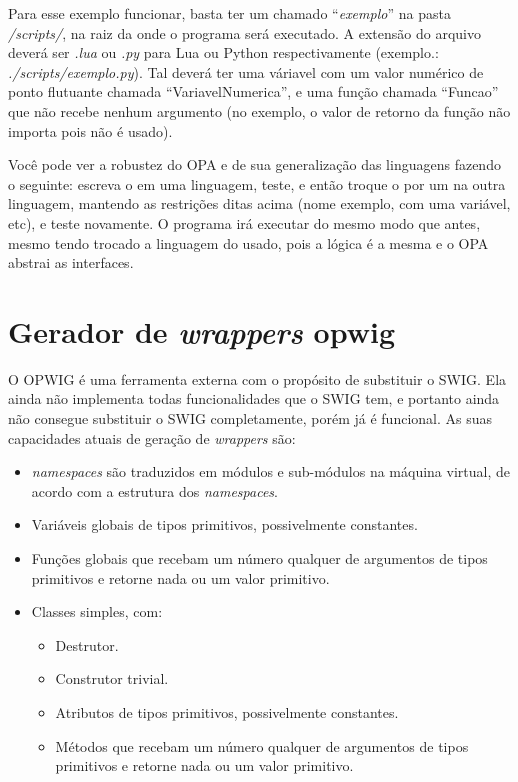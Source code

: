 Para esse exemplo funcionar, basta ter um \script{} chamado ``\textit{exemplo}''
na pasta \textit{/scripts/}, na raiz da onde o programa será executado. A extensão
do arquivo deverá ser \textit{.lua} ou \textit{.py} para Lua ou Python respectivamente
(exemplo.: \textit{./scripts/exemplo.py}). Tal \script{} deverá ter uma váriavel
com um valor numérico de ponto flutuante chamada ``VariavelNumerica'', e uma função
chamada ``Funcao'' que não recebe nenhum argumento (no exemplo, o valor de retorno da
função não importa pois não é usado).

Você pode ver a robustez do OPA e de sua generalização das linguagens fazendo o seguinte:
escreva o \script{} em uma linguagem, teste, e então troque o \script{} por um na
outra linguagem, mantendo as restrições ditas acima (nome exemplo,  com uma variável, etc),
e teste novamente. O programa irá executar do mesmo modo que antes, mesmo tendo trocado a
linguagem do \script{} usado, pois a lógica é a mesma e o OPA abstrai as interfaces.


\section{Gerador de \emph{wrappers} \textbf{opwig}}
O OPWIG é uma ferramenta externa com o propósito de substituir o SWIG.
Ela ainda não implementa todas funcionalidades que o SWIG tem, e portanto
ainda não consegue substituir o SWIG completamente, porém já é funcional.
As suas capacidades atuais de geração de \textit{wrappers} são:
\begin{itemize}
  \item \textit{namespaces} são traduzidos em módulos e sub-módulos na máquina
    virtual, de acordo com a estrutura dos \textit{namespaces}.
  \item Variáveis globais de tipos primitivos, possivelmente constantes.
  \item Funções globais que recebam um número qualquer de argumentos de tipos
    primitivos e retorne nada ou um valor primitivo.
  \item Classes simples, com:
    \begin{itemize}
      \item Destrutor.
      \item Construtor trivial.
      \item Atributos de tipos primitivos, possivelmente constantes.
      \item Métodos que recebam um número qualquer de argumentos de tipos
        primitivos e retorne nada ou um valor primitivo.
    \end{itemize}
\end{itemize}

